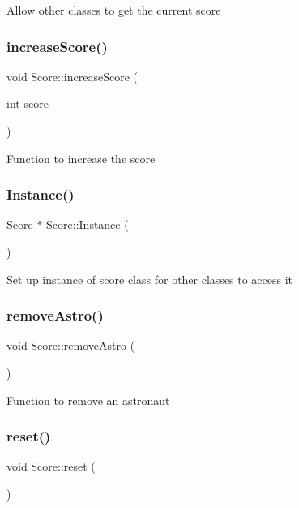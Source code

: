 Allow other classes to get the current score \mbox{\label{class_score_a9be80e91f6252cbb7c59d5212280e00f}} 
\subsubsection{\texorpdfstring{increase\+Score()}{increaseScore()}}
{\footnotesize\ttfamily void Score\+::increase\+Score (\begin{DoxyParamCaption}\item[{int}]{score }\end{DoxyParamCaption})}

Function to increase the score \mbox{\label{class_score_a7d5516454642a247be184d5063404d04}} 
\subsubsection{\texorpdfstring{Instance()}{Instance()}}
{\footnotesize\ttfamily \hyperlink{class_score}{Score} $\ast$ Score\+::\+Instance (\begin{DoxyParamCaption}{ }\end{DoxyParamCaption})\hspace{0.3cm}{\ttfamily [static]}}

Set up instance of score class for other classes to access it \mbox{\label{class_score_ac826af8103f602c71d75d36aeecdff35}} 
\subsubsection{\texorpdfstring{remove\+Astro()}{removeAstro()}}
{\footnotesize\ttfamily void Score\+::remove\+Astro (\begin{DoxyParamCaption}{ }\end{DoxyParamCaption})}

Function to remove an astronaut \mbox{\label{class_score_a32804ba9a847e58160e6e0cef46e1f25}} 
\subsubsection{\texorpdfstring{reset()}{reset()}}
{\footnotesize\ttfamily void Score\+::reset (\begin{DoxyParamCaption}{ }\end{DoxyParamCaption})}

